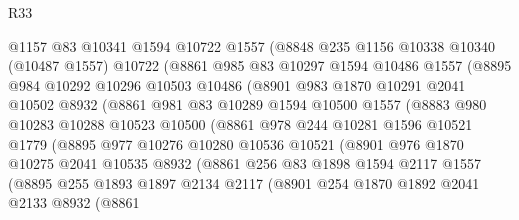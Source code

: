 \begin{lexlean}{R33}
\begin{coremodule}
            @1157
            @83
            @10341
            @1594
            @10722
            @1557
            (@8848
              @235
              @1156
              @10338
              @10340
              (@10487 @1557)
              @10722
              (@8861
                @985
                @83
                @10297
                @1594
                @10486
                @1557
                (@8895
                  @984
                  @10292
                  @10296
                  @10503
                  @10486
                  (@8901
                    @983
                    @1870
                    @10291
                    @2041
                    @10502
                    @8932
                    (@8861
                      @981
                      @83
                      @10289
                      @1594
                      @10500
                      @1557
                      (@8883
                        @980
                        @10283
                        @10288
                        @10523
                        @10500
                        (@8861
                          @978
                          @244
                          @10281
                          @1596
                          @10521
                          @1779
                          (@8895
                            @977
                            @10276
                            @10280
                            @10536
                            @10521
                            (@8901
                              @976
                              @1870
                              @10275
                              @2041
                              @10535
                              @8932
                              (@8861
                                @256
                                @83
                                @1898
                                @1594
                                @2117
                                @1557
                                (@8895
                                  @255
                                  @1893
                                  @1897
                                  @2134
                                  @2117
                                  (@8901
                                    @254
                                    @1870
                                    @1892
                                    @2041
                                    @2133
                                    @8932
                                    (@8861

\end{coremodule}
\end{lexlean}

